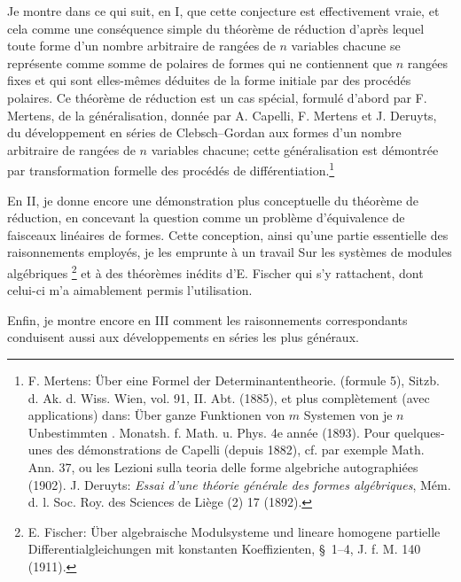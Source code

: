 Je montre dans ce qui suit, en I, que cette conjecture est effectivement vraie, et cela comme une conséquence simple du théorème de réduction d'après lequel toute forme d'un nombre arbitraire de rangées de $n$ variables chacune se représente comme somme de polaires de formes qui ne contiennent que $n$ rangées fixes et qui sont elles-mêmes déduites de la forme initiale par des procédés polaires. Ce théorème de réduction est un cas spécial, formulé d'abord par F. Mertens, de la généralisation, donnée par A. Capelli, F. Mertens et J. Deruyts, du développement en séries de Clebsch--Gordan aux formes d'un nombre arbitraire de rangées de $n$ variables chacune; cette généralisation est démontrée par transformation formelle des procédés de différentiation.\footnote{F. Mertens: \og{} Über eine Formel der Determinantentheorie. \fg{} (formule 5), Sitzb. d. Ak. d. Wiss. Wien, vol. 91, II. Abt. (1885), et plus complètement (avec applications) dans: \og{} Über ganze Funktionen von $m$ Systemen von je $n$ Unbestimmten \fg{}. Monatsh. f. Math. u. Phys. 4e année (1893). Pour quelques-unes des démonstrations de Capelli (depuis 1882), cf. par exemple Math. Ann. 37, ou les \og{} Lezioni sulla teoria delle forme algebriche \fg{} autographiées (1902). J. Deruyts: \emph{Essai d'une théorie générale des formes algébriques}, Mém. d. l. Soc. Roy. des Sciences de Liège (2) 17 (1892).}

En II, je donne encore une démonstration plus conceptuelle du théorème de réduction, en concevant la question comme un problème d'équivalence de faisceaux linéaires de formes. Cette conception, ainsi qu'une partie essentielle des raisonnements employés, je les emprunte à un travail \og{} Sur les systèmes de modules algébriques \fg{}\footnote{E. Fischer: Über algebraische Modulsysteme und lineare homogene partielle Differentialgleichungen mit konstanten Koeffizienten, \S\ 1--4, J. f. M. 140 (1911).} et à des théorèmes inédits d'E. Fischer qui s'y rattachent, dont celui-ci m'a aimablement permis l'utilisation.

Enfin, je montre encore en III comment les raisonnements correspondants conduisent aussi aux développements en séries les plus généraux.

